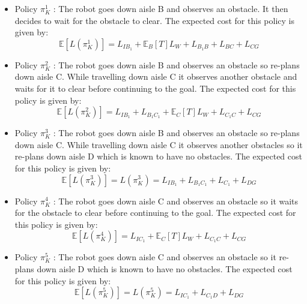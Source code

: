 \documentclass[a4paper,12pt]{article}
\begin{document}
			\begin{itemize}
				\item Policy $\pi_{K}^{1}$ : The robot goes down aisle B and observes an obstacle. It then decides to wait for the obstacle to clear. The expected cost for this policy is given by:
					\begin{equation}
						\mathbb{E}\left[L\left(\pi_{K}^{1}\right)\right] = L_{IB_1} + \mathbb{E}_{B}\left[T\right]L_W + L_{B_1B} + L_{BC} + L_{CG}
					\label{eqn:policyOneCost}
					\end{equation}
					
				\item Policy $\pi_{K}^{2}$ : The robot goes down aisle B and observes an obstacle so re-plans down aisle C. While travelling down aisle C it observes another obstacle and waits for it to clear before continuing to the goal. The expected cost for this policy is given by:
					\begin{equation}
						\mathbb{E}\left[L\left(\pi_{K}^{2}\right)\right] = L_{IB_1} + L_{B_1C_1} + \mathbb{E}_{C}\left[T\right]L_W + L_{C_1C} + L_{CG}
					\label{eqn:policyTwoCost}
					\end{equation}
				
				\item Policy $\pi_{K}^{3}$ : The robot goes down aisle B and observes an obstacle so re-plans down aisle C. While travelling down aisle C it observes another obstacles so it re-plans down aisle D which is known to have no obstacles. The expected cost for this policy is given by:
					\begin{equation}
						\mathbb{E}\left[L\left(\pi_{K}^{3}\right)\right] = L\left(\pi_{K}^{3}\right) = L_{IB_1} + L_{B_1C_1} + L_{C_1} + L_{DG}
					\label{eqn:policyThreeCost}
					\end{equation}
					
				\item Policy $\pi_{K}^{4}$ : The robot goes down aisle C and observes an obstacle so it waits for the obstacle to clear before continuing to the goal. The expected cost for this policy is given by:
					\begin{equation}
						\mathbb{E}\left[L\left(\pi_{K}^{4}\right)\right] = L_{IC_1} + \mathbb{E}_{C}\left[T\right]L_W + L_{C_1C} + L_{CG}
					\label{eqn:policyFourCost}
					\end{equation}
					
				\item Policy $\pi_{K}^{5}$ : The robot goes down aisle C and observes an obstacle so it re-plans down aisle D which is known to have no obstacles. The expected cost for this policy is given by:
					\begin{equation}
						\mathbb{E}\left[L\left(\pi_{K}^{5}\right)\right] = L\left(\pi_{K}^{5}\right) = L_{IC_1} + L_{C_1D} + L_{DG}
					\label{eqn:policyFiveCost}
					\end{equation}
				

\end{itemize}
\end{document}
